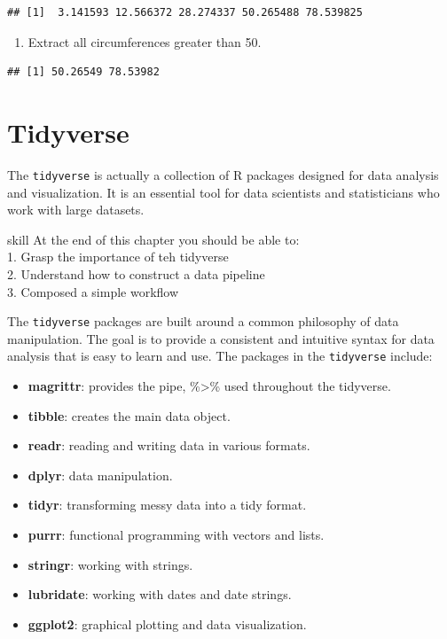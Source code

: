 \documentclass[
]{book}
\providecommand{\tightlist}{%
  \setlength{\itemsep}{0pt}\setlength{\parskip}{0pt}}
\begin{document}
\begin{verbatim}
## [1]  3.141593 12.566372 28.274337 50.265488 78.539825
\end{verbatim}

\begin{enumerate}
\def\labelenumi{\arabic{enumi}.}
\setcounter{enumi}{3}
\tightlist
\item
  Extract all circumferences greater than 50.
\end{enumerate}

\begin{verbatim}
## [1] 50.26549 78.53982
\end{verbatim}

\hypertarget{tidyverse-1}{%
\chapter{Tidyverse}\label{tidyverse-1}}

The \texttt{tidyverse} is actually a collection of R packages designed for data analysis and visualization. It is an essential tool for data scientists and statisticians who work with large datasets.

\begin{infobox}{skill}
At the end of this chapter you should be able to:\\
1. Grasp the importance of teh tidyverse\\
2. Understand how to construct a data pipeline\\
3. Composed a simple workflow

\end{infobox}

The \texttt{tidyverse} packages are built around a common philosophy of data manipulation. The goal is to provide a consistent and intuitive syntax for data analysis that is easy to learn and use. The packages in the \texttt{tidyverse} include:

\begin{itemize}
\tightlist
\item
  \textbf{magrittr}: provides the pipe, \%\textgreater\% used throughout the tidyverse.
\item
  \textbf{tibble}: creates the main data object.
\item
  \textbf{readr}: reading and writing data in various formats.
\item
  \textbf{dplyr}: data manipulation.
\item
  \textbf{tidyr}: transforming messy data into a tidy format.
\item
  \textbf{purrr}: functional programming with vectors and lists.
\item
  \textbf{stringr}: working with strings.
\item
  \textbf{lubridate}: working with dates and date strings.
\item
  \textbf{ggplot2}: graphical plotting and data visualization.
\end{itemize}
\end{document}

